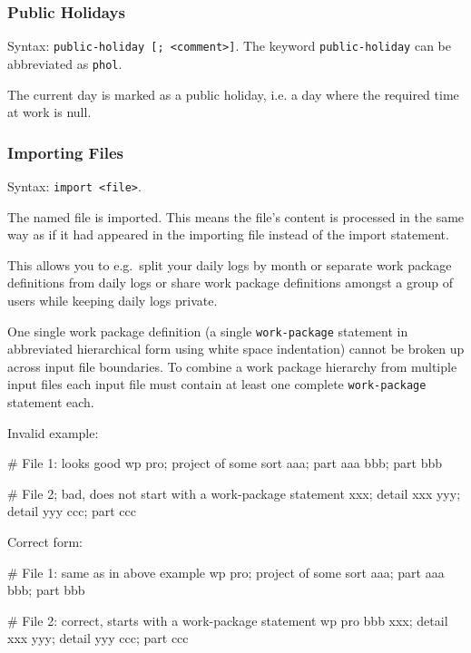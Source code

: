 \documentclass[11pt]{article}
\begin{document}
\subsubsection{Public Holidays}

Syntax: \verb:public-holiday [; <comment>]:.
The keyword \verb:public-holiday: can be abbreviated as \verb:phol:.

The current day is marked as a public holiday, i.e. a day where the required time at work is null.

\subsubsection{Importing Files}

Syntax: \verb:import <file>:.

The named file is imported. This means the file's content is processed in the same way as if it had appeared in the importing file instead of the import statement.

This allows you to e.g.\ split your daily logs by month or separate work package definitions from daily logs or share work package definitions amongst a group of users while keeping daily logs private.

One single work package definition (a single \verb:work-package: statement in abbreviated hierarchical form using white space indentation) cannot be broken up across input file boundaries. To combine a work package hierarchy from multiple input files each input file must contain at least one complete \verb:work-package: statement each.

Invalid example:

\begin{inputfile}
# File 1: looks good
wp pro; project of some sort
    aaa; part aaa
    bbb; part bbb
\end{inputfile}

\begin{inputfile}
# File 2; bad, does not start with a work-package statement
        xxx; detail xxx
        yyy; detail yyy
    ccc; part ccc
\end{inputfile}

Correct form:

\begin{inputfile}
# File 1: same as in above example
wp pro; project of some sort
    aaa; part aaa
    bbb; part bbb
\end{inputfile}

\begin{inputfile}
# File 2: correct, starts with a work-package statement
wp pro
    bbb
        xxx; detail xxx
        yyy; detail yyy
    ccc; part ccc
\end{inputfile}
\end{document}
